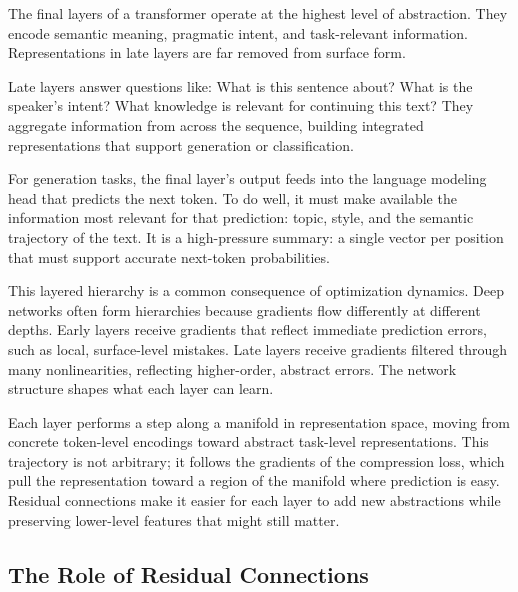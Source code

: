 The final layers of a transformer operate at the highest level of abstraction. They encode semantic meaning, pragmatic intent, and task-relevant information. Representations in late layers are far removed from surface form.

Late layers answer questions like: What is this sentence about? What is the speaker's intent? What knowledge is relevant for continuing this text? They aggregate information from across the sequence, building integrated representations that support generation or classification.

For generation tasks, the final layer's output feeds into the language modeling head that predicts the next token. To do well, it must make available the information most relevant for that prediction: topic, style, and the semantic trajectory of the text. It is a high-pressure summary: a single vector per position that must support accurate next-token probabilities.

\vspace{1em}

This layered hierarchy is a common consequence of optimization dynamics. Deep networks often form hierarchies because gradients flow differently at different depths. Early layers receive gradients that reflect immediate prediction errors, such as local, surface-level mistakes. Late layers receive gradients filtered through many nonlinearities, reflecting higher-order, abstract errors. The network structure shapes what each layer can learn.

\vspace{1.5em}

\begin{geometrylens}
Each layer performs a step along a manifold in representation space, moving from concrete token-level encodings toward abstract task-level representations. This trajectory is not arbitrary; it follows the gradients of the compression loss, which pull the representation toward a region of the manifold where prediction is easy. Residual connections make it easier for each layer to add new abstractions while preserving lower-level features that might still matter.
\end{geometrylens}

\vspace{1.5em}

\subsection{The Role of Residual Connections}

